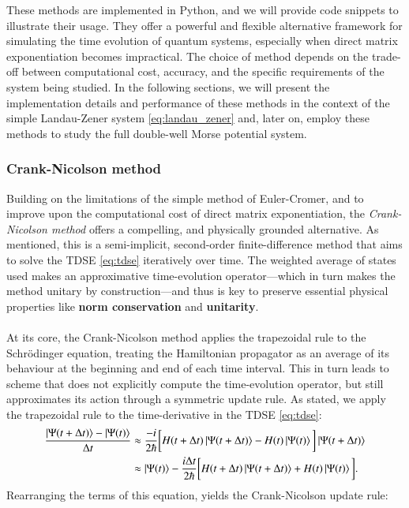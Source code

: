 \documentclass{subfiles}
\begin{document}
These methods are implemented in Python, and we will provide code snippets to illustrate their usage. They offer a powerful and flexible alternative framework for simulating the time evolution of quantum systems, especially when direct matrix exponentiation becomes impractical. The choice of method depends on the trade-off between computational cost, accuracy, and the specific requirements of the system being studied. In the following sections, we will present the implementation details and performance of these methods in the context of the simple Landau-Zener system \eqref{eq:landau_zener} and, later on, employ these methods to study the full double-well Morse potential system.

\subsubsection{Crank-Nicolson method} 
Building on the limitations of the simple method of Euler-Cromer, and to improve upon the computational cost of direct matrix exponentiation, the \emph{Crank-Nicolson method} offers a compelling, and physically grounded alternative. As mentioned, this is a semi-implicit, second-order finite-difference method that aims to solve the TDSE \eqref{eq:tdse} iteratively over time. The weighted average of states used makes an approximative time-evolution operator—which in turn makes the method unitary by construction—and thus is key to preserve essential physical properties like \textbf{norm conservation} and \textbf{unitarity}. \\\\
At its core, the Crank-Nicolson method applies the trapezoidal rule to the Schrödinger equation, treating the Hamiltonian propagator as an average of its behaviour at the beginning and end of each time interval. This in turn leads to scheme that does not explicitly compute the time-evolution operator, but still approximates its action through a symmetric update rule. As stated, we apply the trapezoidal rule to the time-derivative in the TDSE \eqref{eq:tdse}:
\begin{align*}
    \frac{\ket{\Psi(t + \Delta t)} - \ket{\Psi(t)}}{\Delta t} &\approx \frac{-i}{2\hbar}\bigg[H(t + \Delta t)\ket{\Psi(t + \Delta t)} - H(t)\ket{\Psi(t)}\bigg]
    \ket{\Psi(t + \Delta t)} \\
    &\approx \ket{\Psi(t)} - \frac{i\Delta t}{2\hbar}\bigg[H(t + \Delta t)\ket{\Psi(t + \Delta t)} + H(t)\ket{\Psi(t)}\bigg].
\end{align*}
Rearranging the terms of this equation, yields the Crank-Nicolson update rule:
\end{document}
